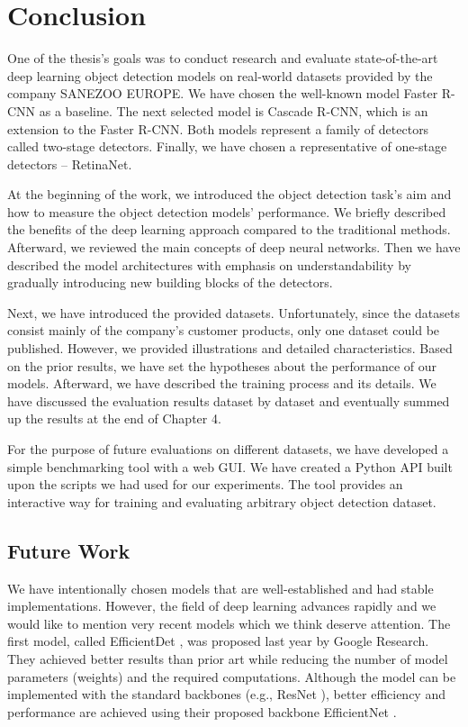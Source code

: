 \chapter{Conclusion}\label{chap:conclusion}

One of the thesis's goals was to conduct research and evaluate state-of-the-art
deep learning object detection models on real-world datasets provided by the
company SANEZOO EUROPE. We have chosen the well-known model Faster R-CNN as a
baseline. The next selected model is Cascade R-CNN, which is an extension to the
Faster R-CNN. Both models represent a family of detectors called two-stage
detectors. Finally, we have chosen a representative of one-stage detectors --
RetinaNet.

At the beginning of the work, we introduced the object detection task's aim and
how to measure the object detection models' performance. We briefly described
the benefits of the deep learning approach compared to the traditional methods.
Afterward, we reviewed the main concepts of deep neural networks. Then we have
described the model architectures with emphasis on understandability by
gradually introducing new building blocks of the detectors.

Next, we have introduced the provided datasets. Unfortunately, since the
datasets consist mainly of the company's customer products, only one dataset
could be published. However, we provided illustrations and detailed
characteristics. Based on the prior results, we have set the hypotheses about
the performance of our models. Afterward, we have described the training
process and its details. We have discussed the evaluation results dataset by
dataset and eventually summed up the results at the end of Chapter 4.

For the purpose of future evaluations on different datasets, we have developed
a simple benchmarking tool with a web GUI. We have created a Python API built
upon the scripts we had used for our experiments. The tool provides an
interactive way for training and evaluating arbitrary object detection dataset.

\section{Future Work}
We have intentionally chosen models that are well-established and had stable
implementations. However, the field of deep learning advances rapidly and we
would like to mention very recent models which we think deserve attention. The
first model, called EfficientDet \cite{efficientdet}, was proposed last year by
Google Research. They achieved better results than prior art while reducing the
number of model parameters (weights) and the required computations. Although the
model can be implemented with the standard backbones (e.g., ResNet
\cite{resnet}), better efficiency and performance are achieved using their
proposed backbone EfficientNet \cite{efficientnet}.


